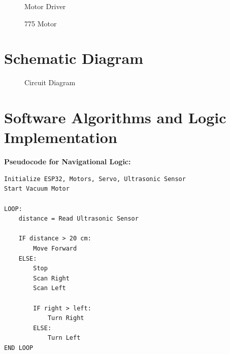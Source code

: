\documentclass[12pt,a4paper]{report}
\begin{document}
\begin{figure}[ht]
\centering
\vspace{5cm}
\caption{Motor Driver}
\end{figure}

\begin{figure}[ht]
\centering
\vspace{5cm}
\caption{775 Motor}
\end{figure}

\section{Schematic Diagram}

\begin{figure}[ht]
\centering
\vspace{6cm}
\caption{Circuit Diagram}
\end{figure}

\section{Software Algorithms and Logic Implementation}

\vspace{0.5cm}

\textbf{Pseudocode for Navigational Logic:}

\vspace{0.5cm}

\newsavebox{\pseudocodebox}
\begin{lrbox}{\pseudocodebox}
\begin{minipage}{0.9\textwidth}
\begin{verbatim}
Initialize ESP32, Motors, Servo, Ultrasonic Sensor
Start Vacuum Motor

LOOP:
    distance = Read Ultrasonic Sensor

    IF distance > 20 cm:
        Move Forward
    ELSE:
        Stop
        Scan Right
        Scan Left

        IF right > left:
            Turn Right
        ELSE:
            Turn Left
END LOOP
\end{verbatim}
\end{minipage}
\end{lrbox}

\begin{center}
\fbox{\usebox{\pseudocodebox}}
\end{center}
\end{document}
